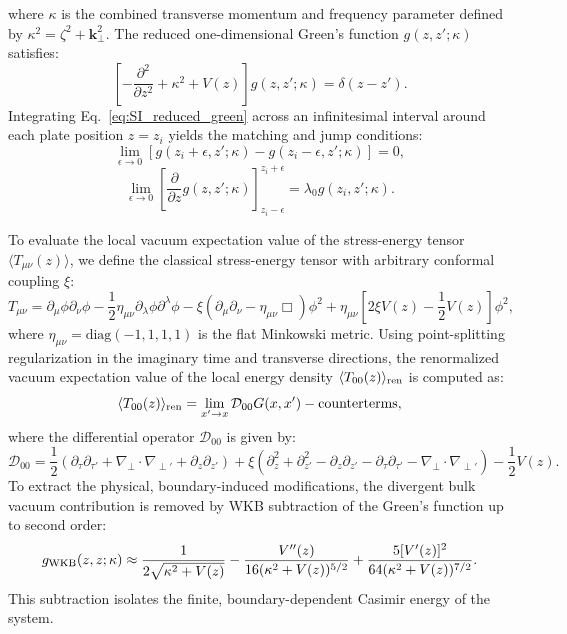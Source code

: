 \documentclass[12pt,letterpaper]{article}
\begin{document}
where $\kappa$ is the combined transverse momentum and frequency parameter defined by $\kappa^2 = \zeta^2 + \mathbf{k}_\perp^2$. The reduced one-dimensional Green's function $g(z, z'; \kappa)$ satisfies:
\begin{equation}
\left[ -\frac{\partial^2}{\partial z^2} + \kappa^2 + V(z) \right] g(z, z'; \kappa) = \delta(z - z').
\label{eq:SI_reduced_green}
\end{equation}
Integrating Eq.~\eqref{eq:SI_reduced_green} across an infinitesimal interval around each plate position $z = z_i$ yields the matching and jump conditions:
\begin{equation}
\lim_{\epsilon \to 0} \left[ g(z_i + \epsilon, z'; \kappa) - g(z_i - \epsilon, z'; \kappa) \right] = 0,
\label{eq:SI_continuity}
\end{equation}
\begin{equation}
\lim_{\epsilon \to 0} \left[ \frac{\partial}{\partial z} g(z, z'; \kappa) \right]_{z_i - \epsilon}^{z_i + \epsilon} = \lambda_0 g(z_i, z'; \kappa).
\label{eq:SI_jump}
\end{equation}

To evaluate the local vacuum expectation value of the stress-energy tensor $\langle T_{\mu\nu}(z) \rangle$, we define the classical stress-energy tensor with arbitrary conformal coupling $\xi$:
\begin{equation}
T_{\mu\nu} = \partial_\mu \phi \partial_\nu \phi - \frac{1}{2} \eta_{\mu\nu} \partial_\lambda \phi \partial^\lambda \phi - \xi \left( \partial_\mu \partial_\nu - \eta_{\mu\nu} \Box \right) \phi^2 + \eta_{\mu\nu} \left[ 2\xi V(z) - \frac{1}{2} V(z) \right] \phi^2,
\label{eq:SI_stress_tensor}
\end{equation}
where $\eta_{\mu\nu} = \mathrm{diag}(-1, 1, 1, 1)$ is the flat Minkowski metric. Using point-splitting regularization in the imaginary time and transverse directions, the renormalized vacuum expectation value of the local energy density $\langle T_{00}(z) \rangle_{\rm ren}$ is computed as:
\begin{equation}
\langle T_{00}(z) \rangle_{\rm ren} = \lim_{x' \to x} \mathcal{D}_{00} G(x, x') - \text{counterterms},
\label{eq:SI_renorm}
\end{equation}
where the differential operator $\mathcal{D}_{00}$ is given by:
\begin{equation}
\mathcal{D}_{00} = \frac{1}{2}\left( \partial_\tau \partial_{\tau'} + \nabla_\perp \cdot \nabla_{\perp'} + \partial_z \partial_{z'} \right) + \xi \left( \partial_z^2 + \partial_{z'}^2 - \partial_z \partial_{z'} - \partial_\tau \partial_{\tau'} - \nabla_\perp \cdot \nabla_{\perp'} \right) - \frac{1}{2} V(z).
\label{eq:SI_D00}
\end{equation}
To extract the physical, boundary-induced modifications, the divergent bulk vacuum contribution is removed by WKB subtraction of the Green's function up to second order:
\begin{equation}
g_{\rm WKB}(z, z; \kappa) \approx \frac{1}{2\sqrt{\kappa^2 + V(z)}} - \frac{V''(z)}{16(\kappa^2 + V(z))^{5/2}} + \frac{5 [V'(z)]^2}{64(\kappa^2 + V(z))^{7/2}}.
\label{eq:SI_WKB}
\end{equation}
This subtraction isolates the finite, boundary-dependent Casimir energy of the system.
\end{document}
